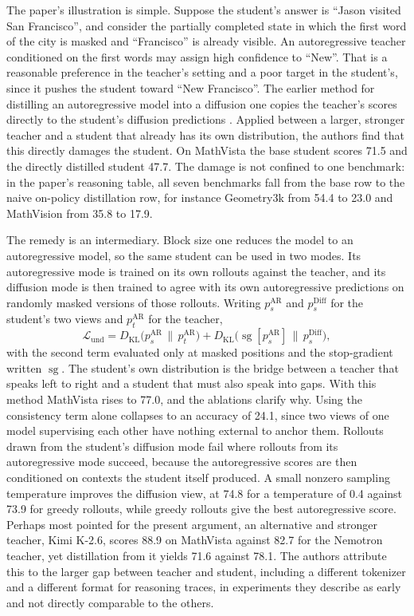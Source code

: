 \documentclass[11pt]{article}
\theoremstyle{remark}
\begin{document}
The paper's illustration is simple. Suppose the student's answer is ``Jason visited San Francisco'', and consider the partially completed state in which the first word of the city is masked and ``Francisco'' is already visible. An autoregressive teacher conditioned on the first words may assign high confidence to ``New''. That is a reasonable preference in the teacher's setting and a poor target in the student's, since it pushes the student toward ``New Francisco''. The earlier method for distilling an autoregressive model into a diffusion one copies the teacher's scores directly to the student's diffusion predictions \cite{su2026}. Applied between a larger, stronger teacher and a student that already has its own distribution, the authors find that this directly damages the student. On MathVista the base student scores 71.5 and the directly distilled student 47.7. The damage is not confined to one benchmark: in the paper's reasoning table, all seven benchmarks fall from the base row to the naive on-policy distillation row, for instance Geometry3k from 54.4 to 23.0 and MathVision from 35.8 to 17.9.

The remedy is an intermediary. Block size one reduces the model to an autoregressive model, so the same student can be used in two modes. Its autoregressive mode is trained on its own rollouts against the teacher, and its diffusion mode is then trained to agree with its own autoregressive predictions on randomly masked versions of those rollouts. Writing $p_s^{\mathrm{AR}}$ and $p_s^{\mathrm{Diff}}$ for the student's two views and $p_t^{\mathrm{AR}}$ for the teacher,
\begin{equation}
\mathcal{L}_{\mathrm{und}}
= D_{\mathrm{KL}}\!\bigl(p_s^{\mathrm{AR}} \,\|\, p_t^{\mathrm{AR}}\bigr)
+ D_{\mathrm{KL}}\!\bigl(\operatorname{sg}[p_s^{\mathrm{AR}}] \,\|\, p_s^{\mathrm{Diff}}\bigr),
\end{equation}
with the second term evaluated only at masked positions and the stop-gradient written $\operatorname{sg}$. The student's own distribution is the bridge between a teacher that speaks left to right and a student that must also speak into gaps. With this method MathVista rises to 77.0, and the ablations clarify why. Using the consistency term alone collapses to an accuracy of 24.1, since two views of one model supervising each other have nothing external to anchor them. Rollouts drawn from the student's diffusion mode fail where rollouts from its autoregressive mode succeed, because the autoregressive scores are then conditioned on contexts the student itself produced. A small nonzero sampling temperature improves the diffusion view, at 74.8 for a temperature of 0.4 against 73.9 for greedy rollouts, while greedy rollouts give the best autoregressive score. Perhaps most pointed for the present argument, an alternative and stronger teacher, Kimi K-2.6, scores 88.9 on MathVista against 82.7 for the Nemotron teacher, yet distillation from it yields 71.6 against 78.1. The authors attribute this to the larger gap between teacher and student, including a different tokenizer and a different format for reasoning traces, in experiments they describe as early and not directly comparable to the others.
\end{document}
